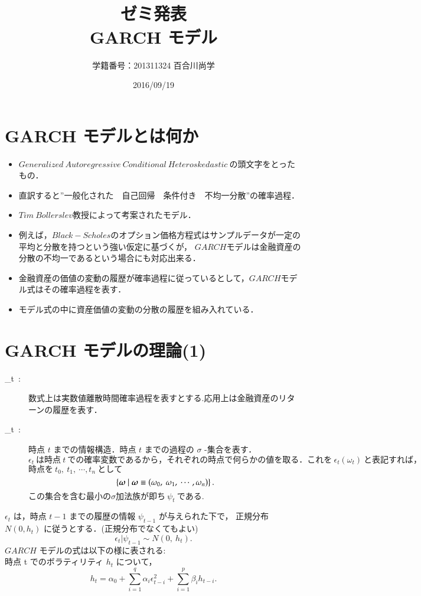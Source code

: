 \documentclass[slide,10pt]{jsarticle}
\def\vector#1{\mbox{\boldmath $#1$}}
\def\sheet #1{\section*{\centering \large \bfseries #1}}
\begin{document}
\title{\fontsize{45pt}{2cm}\selectfont \\ゼミ発表\\GARCH モデル\\}
\author{\Huge 学籍番号：201311324 百合川尚学}
\date{\Huge 2016/09/19}
\maketitle

\sheet{\Huge GARCH モデルとは何か}

{\huge
\begin{itemize}
	\vspace{5mm}
	\item $Generalized\ Autoregressive\ Conditional\ Heteroskedastic\ $の頭文字をとったもの．
	\vspace{5mm}
	\item 直訳すると''一般化された　自己回帰　条件付き　不均一分散''の確率過程．
	\vspace{5mm}
	\item $Tim\ Bollerslev$教授によって考案されたモデル．
	\vspace{5mm}
	\item 例えば，$Black-Scholes$のオプション価格方程式はサンプルデータが一定の平均と分散を持つという強い仮定に基づくが，
		$GARCH$モデルは金融資産の分散の不均一であるという場合にも対応出来る．
	\vspace{5mm}
	\item 金融資産の価値の変動の履歴が確率過程に従っているとして，$GARCH$モデル式はその確率過程を表す．
	\vspace{5mm}
	\item モデル式の中に資産価値の変動の分散の履歴を組み入れている．
\end{itemize}
}

\sheet{\Huge GARCH モデルの理論(1)}

{\huge
\begin{description}
	\item[{\Huge \epsilon_t}\ :\ ] 数式上は実数値離散時間確率過程を表すとする.応用上は金融資産のリターンの履歴を表す．
	\item[{\Huge \psi_t}\ :\ ] 時点 $t$ までの情報構造．時点 $t$ までの過程の $\sigma$ -集合を表す．\\
		$\epsilon_t\ は時点\ t\ での確率変数であるから，それぞれの時点で何らかの値を取る．これを\ \epsilon_t(\omega_t)\ と表記すれば，$
		$時点を\ t_0,\ t_1,\ \cdots,t_n\ として$
		\[
			\left\{\vector{\omega}\ |\ \vector{\omega} \equiv (\omega_0,\ \omega_1,\ \cdots,\omega_n) \right\}.
		\]
		$この集合を含む最小の \sigma 加法族が即ち\ \psi_t\ である.$
\end{description}
$\epsilon_t$ は，時点 $t-1$ までの履歴の情報 $\psi_{t-1}$ が与えられた下で， 正規分布 $N(0, h_t)$ に従うとする．(正規分布でなくてもよい)
\[
	\epsilon_t|\psi_{t-1} \sim N(0,\ h_t).
\]
$GARCH$ モデルの式は以下の様に表される: \\
\qquad 時点 t でのボラティリティ $h_t$ について，
\[
	h_t = \alpha_0 + \sum_{i=1}^{q} \alpha_i \epsilon_{t-i}^2 + \sum_{i=1}^{p} \beta_i h_{t-i}.
\]
}
\end{document}
